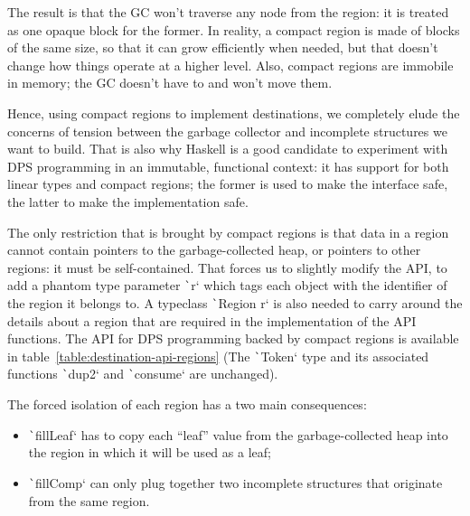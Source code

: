 \documentclass[english]{jflart}
\begin{document}
The result is that the GC won't traverse any node from the region: it is treated as one opaque block for the former. In reality, a compact region is made of blocks of the same size, so that it can grow efficiently when needed, but that doesn't change how things operate at a higher level. Also, compact regions are immobile in memory; the GC doesn't have to and won't move them.

Hence, using compact regions to implement destinations, we completely elude the concerns of tension between the garbage collector and incomplete structures we want to build. That is also why Haskell is a good candidate to experiment with DPS programming in an immutable, functional context: it has support for both linear types and compact regions; the former is used to make the interface safe, the latter to make the implementation safe.

The only restriction that is brought by compact regions is that data in a region cannot contain pointers to the garbage-collected heap, or pointers to other regions: it must be self-contained. That forces us to slightly modify the API, to add a phantom type parameter \texttt`r` which tags each object with the identifier of the region it belongs to. A typeclass \texttt`Region r` is also needed to carry around the details about a region that are required in the implementation of the API functions. The API for DPS programming backed by compact regions is available in table~\ref{table:destination-api-regions} (The \texttt`Token` type and its associated functions \texttt`dup2` and \texttt`consume` are unchanged).

The forced isolation of each region has a two main consequences:
\begin{itemize}
  \item \texttt`fillLeaf` has to copy each ``leaf'' value from the garbage-collected heap into the region in which it will be used as a leaf;
  \item \texttt`fillComp` can only plug together two incomplete structures that originate from the same region.
\end{itemize}
\end{document}
